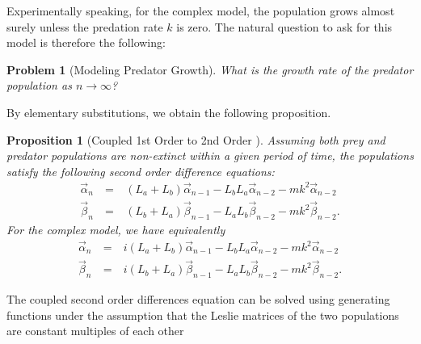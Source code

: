\documentclass[11pt,reqno]{amsart}
\numberwithin{equation}{section}
\newtheorem{prop}[thm]{Proposition}
\theoremstyle{plain}
\newtheorem{problem}[thm]{Problem}
\begin{document}

Experimentally speaking, for the complex model, the population grows almost surely unless the predation rate $k$ is zero. The natural question to ask for this model is therefore the following:

\begin{problem}[Modeling Predator Growth]
    What is the growth rate of the predator population as $n \rightarrow \infty$?
\end{problem}


By elementary substitutions, we obtain the following proposition.

\begin{prop}[Coupled 1st Order to 2nd Order 
]\label{thm:to2ndOrd}
Assuming both prey and predator populations are non-extinct within a given period of time, the populations satisfy the following second order 
difference equations: 
\begin{eqnarray}
\vec \alpha_n & \ = \ & (L_a + L_b) \vec \alpha_{n - 1} - L_b L_a \vec \alpha_{n -2} - m k^2 \vec \alpha_{n - 2} \nonumber
\\
\vec \beta_n & \ = \ & (L_b + L_a) \vec\beta_{n - 1} - L_a L_b \vec\beta_{n -2} - m k^2 \vec\beta_{n - 2}.
\end{eqnarray}
For the complex model, we have equivalently
\begin{eqnarray}
\vec \alpha_n & \ = \ & i(L_a + L_b) \vec \alpha_{n - 1} - L_b L_a \vec \alpha_{n -2} - m k^2 \vec \alpha_{n - 2} \nonumber
\\
\vec \beta_n & \ = \ & i(L_b + L_a) \vec\beta_{n - 1} - L_a L_b \vec\beta_{n -2} - m k^2 \vec\beta_{n - 2}.
\end{eqnarray}
\end{prop}


The coupled second order differences equation can be solved using generating functions under the assumption that the Leslie matrices of the two populations are constant multiples of each other 
\end{document}
